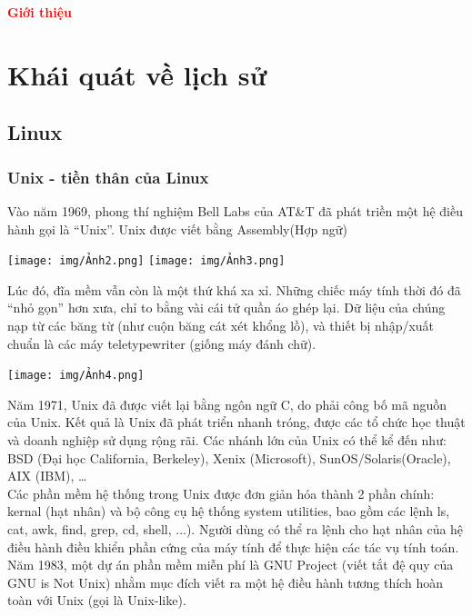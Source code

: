 \documentclass[12pt,a4paper]{article}
\begin{document}
\tableofcontents
\newpage
{}
\begin{center}
	{\fontsize{30}{14}\selectfont \textbf{\textcolor{red}{Giới thiệu}}}
\end{center}

\section{Khái quát về lịch sử}
\subsection{Linux}
\subsubsection{Unix - tiền thân của Linux}
Vào năm 1969, phong thí nghiệm Bell Labs của AT\&T đã phát triền một hệ điều hành gọi là “Unix”. Unix được viết bằng Assembly(Hợp ngữ)
\begin{center}
	\texttt{[image: img/Ảnh2.png]}
	\texttt{[image: img/Ảnh3.png]}

\end{center}
Lúc đó, đĩa mềm vẫn còn là một thứ khá xa xỉ. Những chiếc máy tính thời đó đã “nhỏ gọn” hơn xưa, chỉ to bằng vài cái tử quần áo ghép lại. Dữ liệu của chúng nạp từ các băng từ (như cuộn băng cát xét khổng lồ), và thiết bị nhập/xuất chuẩn là các máy teletypewriter (giống máy đánh chữ).
\begin{center}
	\texttt{[image: img/Ảnh4.png]}
\end{center}
Năm 1971, Unix đã được viết lại bằng ngôn ngữ C, do phải công bố mã nguồn của Unix. Kết quả là Unix đã phát triển nhanh tróng, được các tổ chức học thuật và doanh nghiệp sử dụng rộng rãi. Các nhánh lớn của Unix có thể kể đến như: BSD (Đại học California, Berkeley), Xenix (Microsoft), SunOS/Solaris(Oracle), AIX (IBM), …\\

Các phần mềm hệ thống trong Unix được đơn giản hóa thành 2 phần chính: kernal (hạt nhân) và bộ công cụ hệ thống system utilities, bao gồm các lệnh ls, cat, awk, find, grep, cd, shell, ...). Người dùng có thể ra lệnh cho hạt nhân của hệ điều hành điều khiển phần cứng của máy tính để thực hiện các tác vụ tính toán.\\

Năm 1983, một dự án phần mềm miễn phí là GNU Project (viết tắt đệ quy của GNU is Not Unix) nhằm mục đích viết ra một hệ điều hành tương thích hoàn toàn với Unix (gọi là Unix-like).\\
\end{document}
